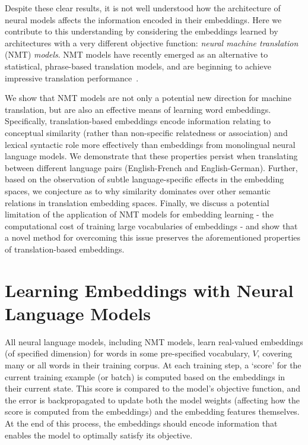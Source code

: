 \documentclass{article} %
\begin{document}
Despite these clear results, it is not well understood how the architecture of neural models affects the information encoded in their embeddings. Here we contribute to this understanding by considering the embeddings learned by architectures with a very different objective function: \emph{neural machine translation} (NMT) \emph{models}. NMT models have recently emerged as an alternative to statistical, phrase-based translation models, and are beginning to achieve impressive translation performance~\citep{kalchbrenner13emnlp,devlin2014fast,Sutskever2014sequence}.

We show that NMT models are not only a potential new direction for machine translation, but are also an effective means of learning word embeddings. Specifically, translation-based embeddings encode information relating to conceptual similarity (rather than non-specific relatedness or association) and lexical syntactic role more effectively than embeddings from monolingual neural language models. We demonstrate that these properties persist when translating between different language pairs (English-French and English-German). Further, based on the observation of subtle language-specific effects in the embedding spaces, we conjecture as to why similarity dominates over other semantic relations in translation embedding spaces. Finally, we discuss a potential limitation of the application of NMT models for embedding learning - the computational cost of training large vocabularies of embeddings - and show that a novel method for overcoming this issue preserves the aforementioned properties of translation-based embeddings. 


\section{Learning Embeddings with Neural Language Models}

All neural language models, including NMT models, learn real-valued embeddings (of specified dimension) for words in some pre-specified vocabulary, \(V\), covering many or all words in their training corpus. At each training step, a `score' for the current training example (or batch) is computed based on the embeddings in their current state. This score is compared to the model's objective function, and the error is backpropagated to update both the model weights (affecting how the score is computed from the embeddings) and the embedding features themselves. At the end of this process, the embeddings should encode information that enables the model to optimally satisfy its objective.     
\end{document}
